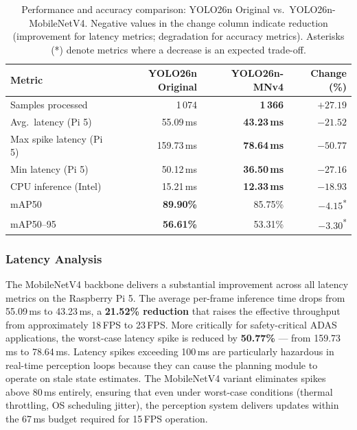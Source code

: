 \begin{table}[htbp]
\centering
\caption{Performance and accuracy comparison: YOLO26n Original vs.\ YOLO26n-MobileNetV4. Negative values in the change column indicate reduction (improvement for latency metrics; degradation for accuracy metrics). Asterisks (*) denote metrics where a decrease is an expected trade-off.}
\label{tab:model_eval}
\renewcommand{\arraystretch}{1.20}
\begin{tabular}{l r r r}
\hline
\textbf{Metric} & \textbf{YOLO26n Original} & \textbf{YOLO26n-MNv4} & \textbf{Change (\%)} \\
\hline
Samples processed           & 1\,074        & \textbf{1\,366}        & $+27.19$  \\
Avg.\ latency (Pi 5)        & 55.09\,ms     & \textbf{43.23\,ms}     & $-21.52$  \\
Max spike latency (Pi 5)    & 159.73\,ms    & \textbf{78.64\,ms}     & $-50.77$  \\
Min latency (Pi 5)          & 50.12\,ms     & \textbf{36.50\,ms}     & $-27.16$  \\
CPU inference (Intel)       & 15.21\,ms     & \textbf{12.33\,ms}     & $-18.93$  \\
mAP50                       & \textbf{89.90\%}       & 85.75\%       & $-4.15$\textsuperscript{*}  \\
mAP50--95                   & \textbf{56.61\% }      & 53.31\%       & $-3.30$\textsuperscript{*}  \\
\hline
\end{tabular}
\end{table}

\subsubsection{Latency Analysis}

The MobileNetV4 backbone delivers a substantial improvement across all latency metrics on the Raspberry Pi 5. The average per-frame inference time drops from 55.09\,ms to 43.23\,ms, a \textbf{21.52\% reduction} that raises the effective throughput from approximately 18\,FPS to 23\,FPS. More critically for safety-critical ADAS applications, the worst-case latency spike is reduced by \textbf{50.77\%} --- from 159.73\,ms to 78.64\,ms. Latency spikes exceeding 100\,ms are particularly hazardous in real-time perception loops because they can cause the planning module to operate on stale state estimates. The MobileNetV4 variant eliminates spikes above 80\,ms entirely, ensuring that even under worst-case conditions (thermal throttling, OS scheduling jitter), the perception system delivers updates within the 67\,ms budget required for 15\,FPS operation.

